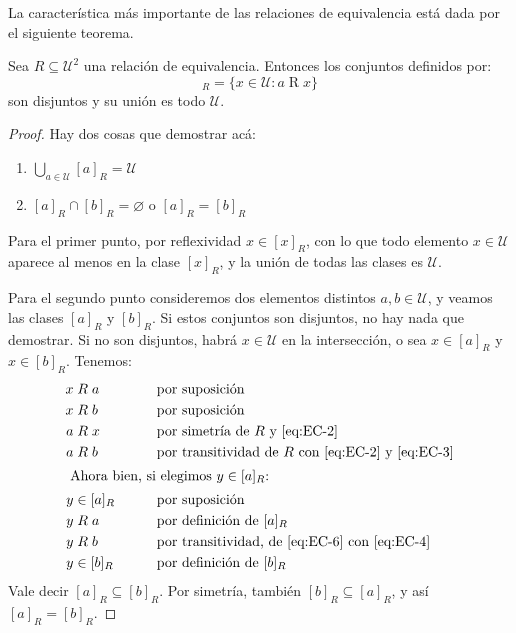   La característica más importante de las relaciones de equivalencia
  está dada por el siguiente teorema.
  \begin{theorem}
    \label{theo:clases-equivalencia}
    Sea \(R \subseteq \mathcal{U}^2\) una relación de equivalencia.
    Entonces los conjuntos definidos por:
    \begin{equation*}
      [a]_R
	= \{x \in \mathcal{U} \colon a \mathrel{R} x\}
    \end{equation*}
    son disjuntos y su unión es todo \(\mathcal{U}\).
  \end{theorem}
  \begin{proof}
    Hay dos cosas que demostrar acá:
    \begin{enumerate}
    \item
      \(\displaystyle \bigcup_{a \in \mathcal{U}} [a]_R = \mathcal{U}\)
    \item
      \(\displaystyle [a]_R \cap [b]_R = \varnothing\) o \([a]_R = [b]_R\)
    \end{enumerate}

    Para el primer punto,
    por reflexividad
    \(x \in [x]_R\),
    con lo que todo elemento \(x \in \mathcal{U}\)
    aparece al menos en la clase \([x]_R\),
    y la unión de todas las clases es \(\mathcal{U}\).

    Para el segundo punto
    consideremos dos elementos distintos \(a, b \in \mathcal{U}\),
    y veamos las clases \([a]_R\) y \([b]_R\).
    Si estos conjuntos son disjuntos,
    no hay nada que demostrar.
    Si no son disjuntos,
    habrá \(x \in \mathcal{U}\)
    en la intersección,
    o sea \(x \in [a]_R\) y \(x \in [b]_R\).
    Tenemos:
    \begin{alignat}{2}
      x &\mathrel{R} a
	&\qquad
	& \text{por suposición}		\label{eq:EC-1} \\
      x &\mathrel{R} b
	&&\text{por suposición}		\label{eq:EC-2} \\
      a &\mathrel{R} x
	&& \text{por simetría de \(R\) y~\eqref{eq:EC-2}} \label{eq:EC-3} \\
      a &\mathrel{R} b
	&& \text{por transitividad de \(R\) con~\eqref{eq:EC-2}
		 y~\eqref{eq:EC-3}} \label{eq:EC-4} \\
    \intertext{
      Ahora bien,
      si elegimos \(y \in [a]_R\):
    }
      y &\in [a]_R
	&& \text{por suposición} \label{eq:EC-5} \\
      y &\mathrel{R} a
	&& \text{por definición de \([a]_R\)} \label{eq:EC-6} \\
      y &\mathrel{R} b
	&& \text{por transitividad,
		 de~\eqref{eq:EC-6} con~\eqref{eq:EC-4}} \label{eq:EC-7} \\
      y &\in [b]_R
	&& \text{por definición de \([b]_R\)} \label{eq:EC-8}
    \end{alignat}
    Vale decir \([a]_R \subseteq [b]_R\).
    Por simetría,
    también \([b]_R \subseteq [a]_R\),
    y así \([a]_R = [b]_R\).
  \end{proof}
